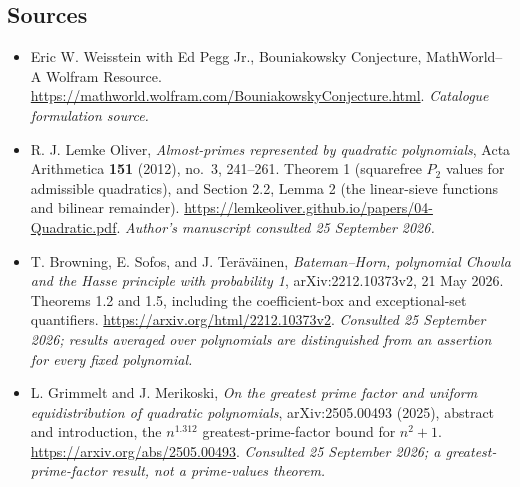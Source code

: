 \documentclass[11pt]{article}
\begin{document}
\subsection{Sources}
\begin{itemize}\raggedright
\item[\textnormal{[S1]}]\hypertarget{source:102:1}{} Eric W. Weisstein with Ed Pegg Jr., Bouniakowsky Conjecture, MathWorld--A Wolfram Resource.
\url{https://mathworld.wolfram.com/BouniakowskyConjecture.html}.
{\small\textit{Catalogue formulation source.}}
\item[\textnormal{[E1]}]\hypertarget{extra:102:1}{}
R. J. Lemke Oliver, \emph{Almost-primes represented by quadratic polynomials},
Acta Arithmetica \textbf{151} (2012), no.~3, 241--261.
Theorem 1 (squarefree $P_2$ values for admissible quadratics), and Section 2.2,
Lemma 2 (the linear-sieve functions and bilinear remainder).
\url{https://lemkeoliver.github.io/papers/04-Quadratic.pdf}.
{\small\textit{Author's manuscript consulted 25 September 2026.}}
\item[\textnormal{[E2]}]\hypertarget{extra:102:2}{}
T. Browning, E. Sofos, and J. Ter\"av\"ainen,
\emph{Bateman--Horn, polynomial Chowla and the Hasse principle with
probability 1}, arXiv:2212.10373v2, 21 May 2026.
Theorems 1.2 and 1.5, including the coefficient-box and exceptional-set
quantifiers. \url{https://arxiv.org/html/2212.10373v2}.
{\small\textit{Consulted 25 September 2026; results averaged over
polynomials are distinguished from an assertion for every fixed polynomial.}}
\item[\textnormal{[E3]}]\hypertarget{extra:102:3}{}
L. Grimmelt and J. Merikoski,
\emph{On the greatest prime factor and uniform equidistribution of quadratic
polynomials}, arXiv:2505.00493 (2025), abstract and introduction,
the $n^{1.312}$ greatest-prime-factor bound for $n^2+1$.
\url{https://arxiv.org/abs/2505.00493}.
{\small\textit{Consulted 25 September 2026; a greatest-prime-factor result,
not a prime-values theorem.}}
\end{itemize}
\end{document}
